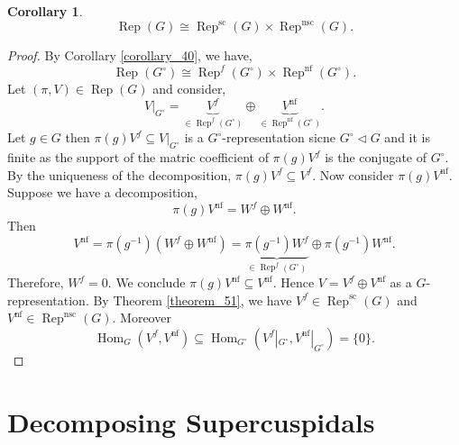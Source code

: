 \documentclass[8pt]{article}
\newtheorem{corollary}{Corollary} [section]
\DeclareMathOperator{\Rep}{Rep}
\DeclareMathOperator{\Hom}{Hom}
\DeclareMathOperator{\supcus}{sc}
\DeclareMathOperator{\nsc}{nsc}
\DeclareMathOperator{\nf}{nf}
\begin{document}
\begin{corollary}
  \label{corollary_55}
  \begin{equation*}
    \Rep(G)\cong\Rep^{\supcus}(G)\times\Rep^{\nsc}(G).
  \end{equation*}
\end{corollary}
\begin{proof}
  By Corollary \ref{corollary_40}, we have,
  \begin{equation*}
    \Rep(G^\circ)\cong\Rep^f(G^\circ)\times\Rep^{\nf}(G^\circ).
  \end{equation*}
  Let $(\pi,V)\in\Rep(G)$ and consider,
  \begin{equation*}
    V|_{G^\circ} = \underbrace{V^f}_{\in \Rep^f(G^\circ)}\oplus \underbrace{V^{\nf}}_{\in \Rep^{\nf}(G^\circ)}.
  \end{equation*}
  Let $g\in G$ then $\pi(g)V^f\subseteq V|_{G^\circ}$ is a $G^\circ$-representation sicne $G^\circ\triangleleft G$ and it is finite as the support of the matric coefficient of $\pi(g)V^f$ is the conjugate of $G^\circ$.
  By the uniqueness of the decomposition, $\pi(g)V^f\subseteq V^f$. Now consider $\pi(g)V^{\nf}$. Suppose we have a decomposition,
  \begin{equation*}
    \pi(g)V^{\nf}=W^f\oplus W^{\nf}.
  \end{equation*}
  Then 
  \begin{equation*}
    V^{\nf}=\pi(g^{-1})(W^f\oplus W^{\nf}) = \underbrace{\pi(g^{-1})W^f}_{\in\Rep^{f}(G^\circ)}\oplus\pi(g^{-1})W^{\nf}.
  \end{equation*}
  Therefore, $W^f=0$. We conclude $\pi(g)V^{\nf}\subseteq V^{\nf}$. Hence $V=V^{f}\oplus V^{\nf}$ as a $G$-representation. By Theorem \ref{theorem_51}, we have $V^f\in\Rep^{\supcus}(G)$ and $V^{\nf}\in\Rep^{\nsc}(G)$. %
  Moreover 
  \begin{equation*}
    \Hom_G(V^f,V^{\nf})\subseteq\Hom_{G^\circ}(V^f|_{G^\circ},V^{\nf}|_{G^\circ}) = \{0\}.
  \end{equation*}
\end{proof}
\section{Decomposing Supercuspidals}
\end{document}
